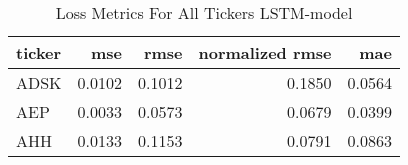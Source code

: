 \begin{table}
\caption{Loss Metrics For All Tickers LSTM-model}
\label{tab:loss_total_lstm}
\begin{tabular}{lrrrr}
\toprule
ticker & mse & rmse & normalized rmse & mae \\
\midrule
ADSK & 0.0102 & 0.1012 & 0.1850 & 0.0564 \\
AEP & 0.0033 & 0.0573 & 0.0679 & 0.0399 \\
AHH & 0.0133 & 0.1153 & 0.0791 & 0.0863 \\
\bottomrule
\end{tabular}
\end{table}
